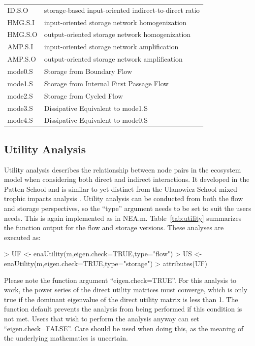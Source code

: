 \documentclass[article]{jss}
\begin{document}
\begin{table}[]
\begin{small}
\begin{tabular}{l l}
      ID.S.O & storage-based input-oriented indirect-to-direct ratio \citep[as in][]{fath06}\\
      HMG.S.I & input-oriented storage network homogenization \\
      HMG.S.O & output-oriented storage network homogenization\\
      AMP.S.I &  input-oriented storage network amplification \\
      AMP.S.O & output-oriented storage network amplification \\
      mode0.S & Storage from Boundary Flow \\
      mode1.S & Storage from Internal First Passage Flow \\
      mode2.S & Storage from Cycled Flow \\
      mode3.S & Dissipative Equivalent to mode1.S \\
      mode4.S & Dissipative Equivalent to mode0.S \\ \hline
    \end{tabular}
\end{small}
\end{table}

\subsection{Utility Analysis}
Utility analysis describes the relationship between node pairs in the
ecosystem model when considering both direct and indirect
interactions.  It developed in the Patten School \citep{patten91,
  fath99_review} and is similar to yet distinct from the Ulanowicz
School mixed trophic impacts analysis \citep{ulanowicz90}.  Utility
analysis can be conducted from both the flow and storage perspectives,
so the ``type'' argument needs to be set to suit the users needs.
This is again implemented as in NEA.m.  Table~\ref{tab:utility}
summarizes the function output for the flow and storage
versions. These analyses are executed as:

\begin{Schunk}
\begin{Sinput}
> UF <- enaUtility(m,eigen.check=TRUE,type="flow")
> US <- enaUtility(m,eigen.check=TRUE,type="storage")
> attributes(UF)
\end{Sinput}
\end{Schunk}

Please note the function argument ``eigen.check=TRUE''.  For this
analysis to work, the power series of the direct utility matrices must
converge, which is only true if the dominant eigenvalue of the direct
utility matrix is less than 1. The function default prevents the
analysis from being performed if this condition is not met. Users that
wish to perform the analysis anyway can set ``eigen.check=FALSE''.  Care
should be used when doing this, as the meaning of the underlying
mathematics is uncertain.
\end{document}
